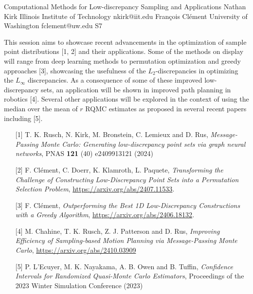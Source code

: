 

\clearpage

\begin{session}
 {Computational Methods for Low-discrepancy Sampling and Applications}%
 {Nathan Kirk}%
 {Illinois Institute of Technology}%
 {nkirk@iit.edu}%
 {Fran\c{c}ois Cl\'ement}%
 {University of Washington}%
 {fclement@uw.edu}%
 {S7}%
{}

 This session aims to showcase recent advancements in the optimization of sample point distributions [1, 2] and their applications. Some of the methods on display will range from deep learning methods to permutation optimization and greedy approaches [3], showcasing the usefulness of the $L_2$-discrepancies in optimizing the $L_{\infty}$ discrepancies. As a consequence of some of these improved low-discrepancy sets, an application will be shown in improved path planning in robotics [4]. Several other applications will be explored in the context of using the median over the mean of $r$ RQMC estimates as proposed in several recent papers including [5].
 \medskip
 \begin{enumerate}
 \item[{[1]}] T. K. Rusch, N. Kirk, M. Bronstein, C. Lemieux and D. Rus, \textit{Message-Passing Monte Carlo: Generating low-discrepancy point sets via graph neural networks}, PNAS \textbf{121} (40) e2409913121 (2024)
 \item[{[2]}] F. Cl\'ement, C. Doerr, K. Klamroth, L. Paquete, \textit{Transforming the Challenge of Constructing Low-Discrepancy Point Sets into a Permutation Selection Problem}, \url{https://arxiv.org/abs/2407.11533}.
 \item[{[3]}] F. Cl\'ement, \textit{Outperforming the Best {1D} Low-Discrepancy Constructions with a Greedy Algorithm}, \url{https://arxiv.org/abs/2406.18132}.
 \item[{[4]}] M. Chahine, T. K. Rusch, Z. J. Patterson and D. Rus, \textit{Improving Efficiency of Sampling-based Motion Planning via Message-Passing Monte Carlo}, \url{https://arxiv.org/abs/2410.03909}
 \item[{[5]}] P. L'Ecuyer, M. K. Nayakama, A. B. Owen and B. Tuffin, \textit{Confidence Intervals for Randomized Quasi-Monte Carlo Estimators}, Proceedings of the 2023 Winter Simulation Conference (2023)
 \end{enumerate}
\end{session}

